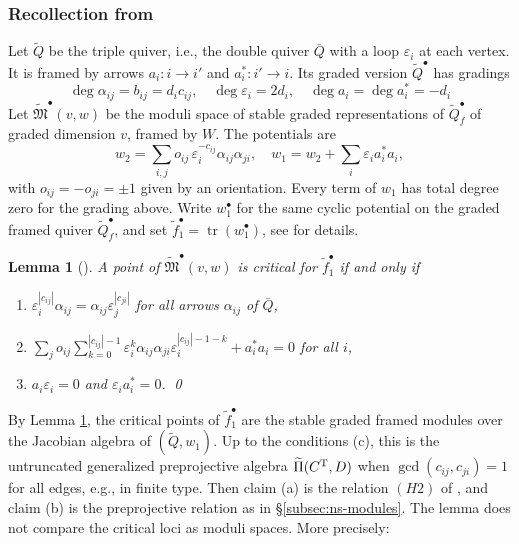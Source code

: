 \documentclass[11pt,reqno]{amsart}
\newtheorem{Lemma}[Theorem]{Lemma}
\theoremstyle{definition}
\theoremstyle{remark}
\begin{document}
\subsubsection{Recollection from \cite{VV23}}
Let $\widetilde Q$ be the triple quiver, i.e.,  the double quiver $\bar Q$ with a loop $\varepsilon_i$ at each
vertex. It is framed by arrows $a_i:i\to i'$ and $a_i^*:i'\to i$. Its graded version $\widetilde Q^\bullet$ has gradings 
$$\deg\alpha_{ij}=b_{ij}=d_ic_{ij}
,\quad
\deg\varepsilon_i=2d_i
,\quad
\deg a_i=\deg a_i^*=-d_i$$
Let $\widetilde{\mathfrak M}^\bullet(v,w)$ be the moduli space of stable graded representations of $\widetilde Q^\bullet_f$ of graded 
dimension $v$, framed by $W$. The potentials are
\[
w_2=\sum_{i,j}o_{ij}\,\varepsilon_i^{-c_{ij}}\alpha_{ij}\alpha_{ji},\quad w_1=w_2+\sum_i\varepsilon_ia_i^*a_i,
\]
with $o_{ij}=-o_{ji}=\pm1$ given by an orientation.
Every term of $w_1$ has total degree zero for the grading above.
Write $w_1^\bullet$ for the same cyclic potential on the graded
framed quiver $\widetilde Q_f^\bullet$, and set
$\tilde f^\bullet_1=\operatorname{tr}(w_1^\bullet)$, see \cite{VV23} for details.

\begin{Lemma}[\cite{VV23}]\label{lem:VV23-crit}
A point of $\widetilde{\mathfrak M}^\bullet(v,w)$ is critical for $\tilde f^\bullet_1$ if and only if
\begin{enumerate}[label=$\mathrm{(\alph*)}$,leftmargin=8mm,itemsep=2mm]
\item $\varepsilon_i^{|c_{ij}|}\alpha_{ij}=\alpha_{ij}\varepsilon_j^{|c_{ji}|}$ for all arrows $\alpha_{ij}$ of $\bar Q$,
\item $\sum_jo_{ij}\sum_{k=0}^{|c_{ij}|-1}\varepsilon_i^{k}\alpha_{ij}\alpha_{ji}\varepsilon_i^{|c_{ij}|-1-k}+a_i^*a_i=0$ for all $i$,
\item $a_i\varepsilon_i=0$ and $\varepsilon_ia_i^*=0$.
\qed
\end{enumerate}
\end{Lemma}




By Lemma \ref{lem:VV23-crit}, 
the critical points of $\tilde f^\bullet_1$
are the stable graded framed modules over the Jacobian algebra of $(\widetilde Q,w_1)$. 
Up to the conditions (c), this is
the untruncated generalized preprojective algebra $\widetilde\Pi(C^{\rm T},D)$ when $\gcd(c_{ij},c_{ji})=1$ for all edges, e.g., in finite type. 
Then claim (a) is the relation $(H2)$ of \cite{GLS},
and claim (b) is the preprojective relation as in  \S\ref{subsec:ns-modules}. 
The lemma does not compare the critical loci
as moduli spaces. More precisely:
\end{document}
